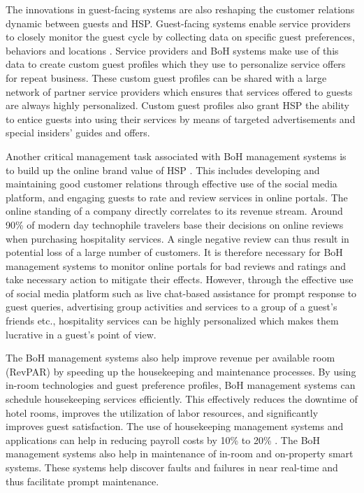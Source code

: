\documentclass[10pt,journal,letterpaper]{IEEEtran}
\begin{document}
{The innovations in guest-facing systems are also reshaping the customer relations dynamic between guests and HSP. Guest-facing systems enable service providers to closely monitor the guest cycle by collecting data on specific guest preferences, behaviors and locations \cite{Wang_Tech_2017} \cite{Piccoli_Personalization_2017}. Service providers and BoH systems make use of this data to create custom guest profiles which they use to personalize service offers for repeat business. These custom guest profiles can be shared with a large network of partner service providers which ensures that services offered to guests are always highly personalized. Custom guest profiles also grant HSP the ability to entice guests into using their services by means of targeted advertisements and special insiders' guides and offers.

Another critical management task associated with BoH management systems is to build up the online brand value of HSP \cite{Lee_OnlineBrand_2014}. This includes developing and maintaining good customer relations through effective use of the social media platform, and engaging guests to rate and review services in online portals. The online standing of a company directly correlates to its revenue stream. Around 90\% of modern day technophile travelers base their decisions on online reviews when purchasing hospitality services. A single negative review can thus result in potential loss of a large number of customers. It is therefore necessary for BoH management systems to monitor online portals for bad reviews and ratings and take necessary action to mitigate their effects. However, through the effective use of social media platform such as live chat-based assistance for prompt response to guest queries, advertising group activities and services to a group of a guest's friends etc., hospitality services can be highly personalized which makes them lucrative in a guest's point of view.

The BoH management systems also help improve revenue per available room (RevPAR) \cite{Altin_RevPAR_2017} by speeding up the housekeeping and maintenance processes. By using in-room technologies and guest preference profiles, BoH management systems can schedule housekeeping services efficiently. This effectively reduces the downtime of hotel rooms, improves the utilization of labor resources, and significantly improves guest satisfaction. The use of housekeeping management systems and applications can help in reducing payroll costs by 10\% to 20\% \cite{Kasavana_HospitalityIndustry_2014}. The BoH management systems also help in maintenance of in-room and on-property smart systems. These systems help discover faults and failures in near real-time and thus facilitate prompt maintenance.
%
%
}
\end{document}
